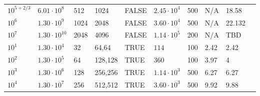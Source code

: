 \documentclass[aps, pre, onecolumn, nofootinbib, notitlepage, groupedaddress, amsfonts, amssymb, amsmath, longbibliography]{revtex4-1}
\begin{document}
\begin{center}
\begin{tabularx}{\textwidth}{ X X X X X X X X X X }
$10^{5 + 2/3}$	&	$6.01 \cdot 10^8$	&	512	&	1024	&	FALSE	&	$2.45 \cdot 10^4$	&	500	&	N/A	&	18.58	\\
$10^6$	&	$1.30 \cdot 10^9$	&	1024	&	2048	&	FALSE	&	$3.60 \cdot 10^4$	&	500	&	N/A	&	22.132	\\
$10^7$	&	$1.30 \cdot 10^{10}$	&	2048	&	4096	&	FALSE	&	$1.14 \cdot 10^5$	&	200	&	N/A	&	TBD	\\
$10^1$	&	$1.30 \cdot 10^4$	&	32	&	64,64	&	TRUE	&	$114$	&	100	&	2.42	&	2.42	\\
$10^2$	&	$1.30 \cdot 10^5$	&	64	&	128,128	&	TRUE	&	$360$	&	100	&	3.97	&	4	\\
$10^3$	&	$1.30 \cdot 10^6$	&	128	&	256,256	&	TRUE	&	$1.14 \cdot 10^3$	&	500	&	6.27	&	6.27	\\
$10^4$	&	$1.30 \cdot 10^7$	&	256	&	512,512	&	TRUE	&	$3.60 \cdot 10^3$	&	500	&	9.92	&	9.88	\\
\hline																	
\end{tabularx}
\end{center}







\end{document}

